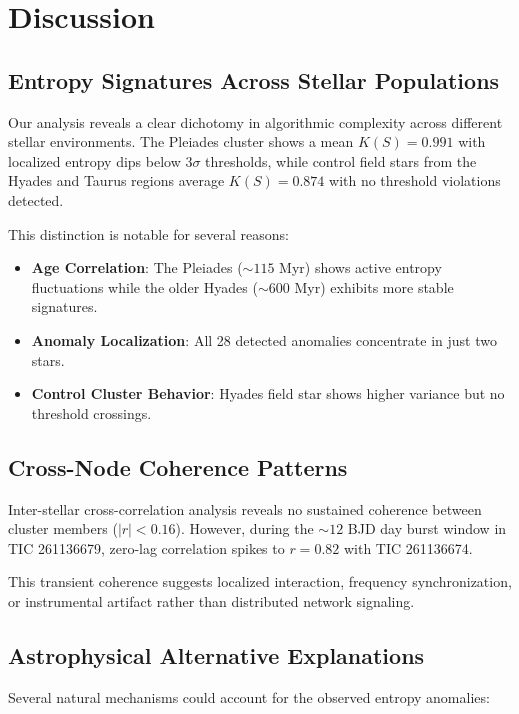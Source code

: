 \documentclass[twocolumn,10pt]{article}
\begin{document}
\section{Discussion}

\subsection{Entropy Signatures Across Stellar Populations}

Our analysis reveals a clear dichotomy in algorithmic complexity across different stellar environments. The Pleiades cluster shows a mean $K(S)=0.991$ with localized entropy dips below $3\sigma$ thresholds, while control field stars from the Hyades and Taurus regions average $K(S)=0.874$ with no threshold violations detected.

This distinction is notable for several reasons:

\begin{itemize}
    \item \textbf{Age Correlation}: The Pleiades ($\sim 115$ Myr) shows active entropy fluctuations while the older Hyades ($\sim 600$ Myr) exhibits more stable signatures.
    \item \textbf{Anomaly Localization}: All 28 detected anomalies concentrate in just two stars.
    \item \textbf{Control Cluster Behavior}: Hyades field star shows higher variance but no threshold crossings.
\end{itemize}

\subsection{Cross-Node Coherence Patterns}

Inter-stellar cross-correlation analysis reveals no sustained coherence between cluster members ($|r|<0.16$). However, during the $\sim 12$ BJD day burst window in TIC 261136679, zero-lag correlation spikes to $r=0.82$ with TIC 261136674.

This transient coherence suggests localized interaction, frequency synchronization, or instrumental artifact rather than distributed network signaling.

\subsection{Astrophysical Alternative Explanations}

Several natural mechanisms could account for the observed entropy anomalies:
\end{document}
